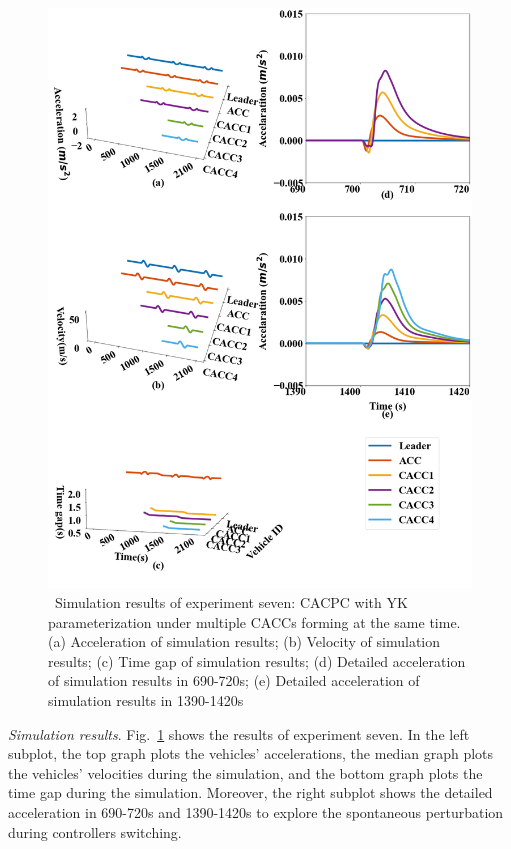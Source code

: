 \documentclass[trsc,nonblindrev]{informs3} %
\begin{document}
\begin{figure}[htb]
    \centering
    \includegraphics[width=14cm]{figs/extendfig7.png}
    \caption{~Simulation results of experiment seven: CACPC with YK parameterization under multiple CACCs forming at the same time. (a) Acceleration of simulation results; (b) Velocity of simulation results; (c) Time gap of simulation results; (d) Detailed acceleration of simulation results in 690-720s; (e) Detailed acceleration of simulation results in 1390-1420s}
    \label{extend7}
\end{figure}

\textit{Simulation results}. Fig.~\ref{extend7} shows the results of experiment seven. In the left subplot, the top graph plots the vehicles' accelerations, the median graph plots the vehicles' velocities during the simulation, and the bottom graph plots the time gap during the simulation. Moreover, the right subplot shows the detailed acceleration in 690-720s and 1390-1420s to explore the spontaneous perturbation during controllers switching.
\end{document}
